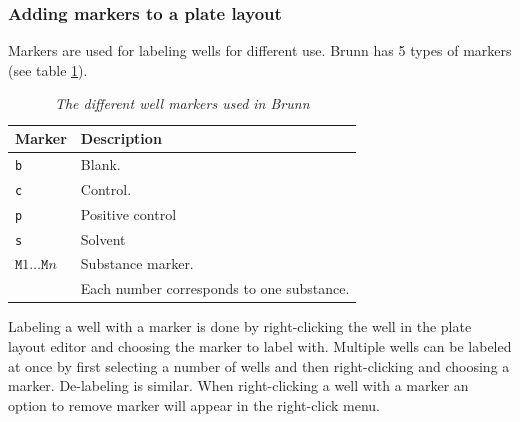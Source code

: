 \documentclass[a4paper,10pt]{article}
\begin{document}
            \subsubsection{Adding markers to a plate layout}
                Markers are used for labeling wells for different use. Brunn
                has 5 types of markers (see table \ref{markersTable}).

                \begin{table}
                    \begin{center}
                        \begin{tabular}{l|l}
                            Marker & Description \\
                            \hline
                            \texttt{b} & Blank.           \\
                            \texttt{c} & Control.         \\
                            \texttt{p} & Positive control \\
                            \texttt{s} & Solvent          \\
                            $\texttt{M}\textit{1} \ldots \texttt{M}n$ 
                                                  & Substance marker. \\ 
                                                  & Each number corresponds to
                                                    one substance. \\
                        \end{tabular}
                    \end{center}
                    \caption{\textit{The different well markers used in Brunn}}
                    \label{markersTable}
                \end{table}
                
                Labeling a well with a marker is done by right-clicking the
                well in the plate layout editor and choosing the marker to
                label with. Multiple wells can be labeled at once by first
                selecting a number of wells and then right-clicking and
                choosing a marker. De-labeling is similar. When right-clicking a
                well with a marker an option to remove marker will appear in the
                right-click menu.
\end{document}
